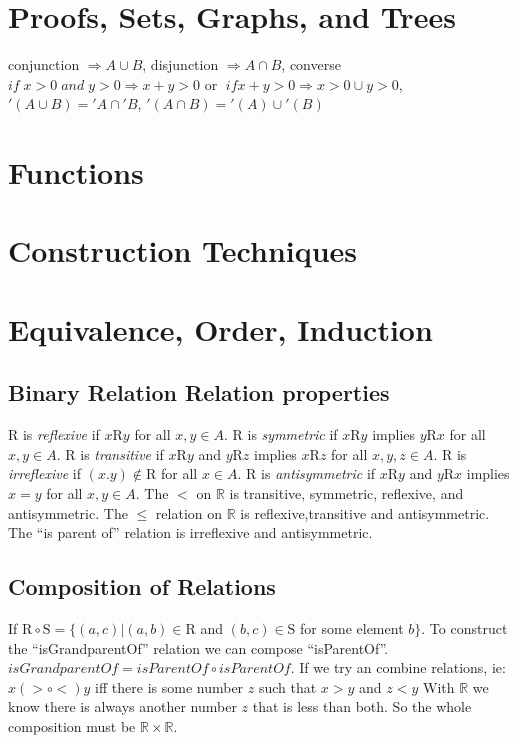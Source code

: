 \documentclass[10pt,twocolumn, letterpaper]{article}
\begin{document}
\section{Proofs, Sets, Graphs, and Trees}
conjunction $ \Rightarrow A \cup B $, disjunction $ \Rightarrow A \cap B $, 
converse $ if\;x > 0\;and\;y > 0 \Rightarrow x + y > 0 $ or $\;if x + y > 0 \Rightarrow x > 0 \cup y > 0 $, 
$ '(A \cup B) = 'A \cap 'B $, $ '(A \cap B) = '(A) \cup '(B) $

\section{Functions}

\section{Construction Techniques}

\section{Equivalence, Order, Induction}

\subsection*{Binary Relation Relation properties}
$ \mathrm{R} $ is \textit{reflexive} if $x \mathrm{R} y$ for all $x,y \in A$. 
$ \mathrm{R} $ is \textit{symmetric} if $x \mathrm{R} y$ implies $y \mathrm{R} x$ for all $x,y \in A$.
$ \mathrm{R} $ is \textit{transitive} if $x \mathrm{R} y$ and $y \mathrm{R} z$ implies $x \mathrm{R} z$ for all $x,y,z \in A$. 
$ \mathrm{R} $ is \textit{irreflexive} if $(x.y) \notin \mathrm{R}$ for all $x \in A$. 
$ \mathrm{R} $ is \textit{antisymmetric} if $x \mathrm{R} y$ and $y \mathrm{R} x$ implies $x = y$ for all $x,y \in A$. 
The $<$ on $\mathbb{R}$ is transitive, symmetric, reflexive, and antisymmetric. 
The $\leq$ relation on $\mathbb{R}$ is reflexive,transitive and antisymmetric.
The ``is parent of'' relation is irreflexive and antisymmetric.

\subsection*{Composition of Relations}
If $\mathrm{R} \circ \mathrm{S} = \lbrace(a,c) \vert (a,b) \in \mathrm{R}$ and $(b,c) \in \mathrm{S}$ for some element $b\rbrace$.
To construct the ``isGrandparentOf'' relation we can compose ``isParentOf''.
$isGrandparentOf = isParentOf \circ isParentOf$. If we try an combine relations, ie: $ x(> \circ <) y$ iff there is some
number $z$ such that $x > y$ and $z < y$ With $\mathbb{R}$ we know there is always another number $z$ that is less than both.
So the whole composition must be $\mathbb{R} \times \mathbb{R}$. 
\end{document}
